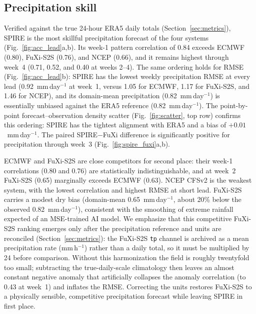 \documentclass[11pt]{article}
\begin{document}
\subsection{Precipitation skill}\label{sec:precip_skill}

Verified against the true 24-hour ERA5 daily totals
(Section~\ref{sec:metrics}), SPIRE is the most skillful precipitation
forecast of the four systems (Fig.~\ref{fig:acc_lead}a,b). Its week-1
pattern correlation of 0.84 exceeds ECMWF (0.80), FuXi-S2S (0.76), and
NCEP (0.66), and it remains highest through week~4 (0.71, 0.52, and 0.40
at weeks 2--4). The same ordering holds for RMSE
(Fig.~\ref{fig:acc_lead}b): SPIRE has the lowest weekly precipitation
RMSE at every lead (0.92~mm\,day$^{-1}$ at week~1, versus 1.05 for ECMWF,
1.17 for FuXi-S2S, and 1.46 for NCEP), and its domain-mean precipitation
(0.82~mm\,day$^{-1}$) is essentially unbiased against the ERA5 reference
(0.82~mm\,day$^{-1}$). The point-by-point forecast--observation density
scatter (Fig.~\ref{fig:scatter}, top row) confirms this ordering: SPIRE
has the tightest alignment with ERA5 and a bias of $+0.01$~mm\,day$^{-1}$.
The paired SPIRE$-$FuXi difference is significantly positive for
precipitation through week~3 (Fig.~\ref{fig:spire_fuxi}a,b).

ECMWF and FuXi-S2S are close competitors for second place: their week-1
correlations (0.80 and 0.76) are statistically indistinguishable, and at
week~2 FuXi-S2S (0.65) marginally exceeds ECMWF (0.63). NCEP CFSv2 is the
weakest system, with the lowest correlation and highest RMSE at short
lead. FuXi-S2S carries a modest dry bias (domain-mean
0.65~mm\,day$^{-1}$, about 20\% below the observed 0.82~mm\,day$^{-1}$),
consistent with the smoothing of extreme rainfall expected of an
MSE-trained AI model. We emphasize that this competitive FuXi-S2S ranking
emerges only after the precipitation reference and units are reconciled
(Section~\ref{sec:metrics}): the FuXi-S2S \texttt{tp} channel is archived
as a mean precipitation rate (mm\,h$^{-1}$) rather than a daily total, so
it must be multiplied by 24 before comparison. Without this harmonization
the field is roughly twentyfold too small; subtracting the
true-daily-scale climatology then leaves an almost constant negative
anomaly that artificially collapses the anomaly correlation (to 0.43 at
week~1) and inflates the RMSE. Correcting the units restores FuXi-S2S to
a physically sensible, competitive precipitation forecast while leaving
SPIRE in first place.
\end{document}

